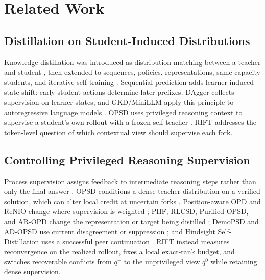 \documentclass[letterpaper]{article}
\newcommand{\RIFT}{\textsc{RIFT}}
\begin{document}
\section{Related Work}

\subsection{Distillation on Student-Induced Distributions}

Knowledge distillation was introduced as distribution matching between a
teacher and student \citep{hinton2015distilling}, then extended to sequences,
policies, representations, same-capacity students, and iterative self-training
\citep{kim2016sequence,rusu2015policy,sun2019patient,
furlanello2018bornagain,xie2020noisystudent}. Sequential prediction adds
learner-induced state shift: early student actions determine later prefixes.
DAgger collects supervision on learner states, and GKD/MiniLLM apply this
principle to autoregressive language models
\citep{ross2011reduction,agarwal2024gkd,gu2024minillm}. OPSD uses privileged
reasoning context to supervise a student's own rollout with a frozen
self-teacher \citep{zhao2026opsd}. \RIFT{} addresses the token-level question
of which contextual view should supervise each fork.

\subsection{Controlling Privileged Reasoning Supervision}

Process supervision assigns feedback to intermediate reasoning steps rather
than only the final answer \citep{uesato2022process,lightman2023verify}. OPSD
conditions a dense teacher distribution on a verified solution, which can
alter local credit at uncertain forks \citep{kaur2026rethinking,peng2026adopsd}.
Position-aware OPD and ReNIO change where supervision is weighted
\citep{xie2026position,lin2026renio}; PHF, RLCSD, Purified OPSD, and AR-OPD
change the representation or target being distilled
\citep{li2026phf,pan2026rlcsd,shen2026purified,zhang2026aropd}; DemoPSD and
AD-OPSD use current disagreement or suppression
\citep{li2026demopsd,peng2026adopsd}; and Hindsight Self-Distillation uses a
successful peer continuation \citep{li2026hsd}. \RIFT{} instead measures
reconvergence on the realized rollout, fixes a local exact-rank budget, and
switches recoverable conflicts from $q^+$ to the unprivileged view $q^0$ while
retaining dense supervision.
\end{document}
